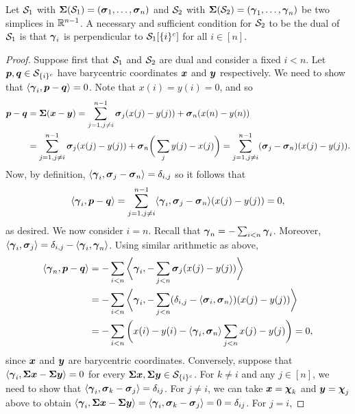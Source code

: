 \begin{lemma}
	Let $\mathcal{S}_1$ with $\boldsymbol{\Sigma}(\mathcal{S}_1)=(\vb*{\sigma}_1,\dots,\vb*{\sigma}_n)$ and $\mathcal{S}_2$ with $\boldsymbol{\Sigma}(\mathcal{S}_2)=(\vb*{\gamma}_1,\dots,\vb*{\gamma}_n)$ be two simplices in $\mathbb{R}^{n-1}$. A necessary and sufficient condition for $\mathcal{S}_2$ to be the dual of $\mathcal{S}_1$ is that $\vb*{\gamma}_i$ is perpendicular to $\mathcal{S}_1[{\{i\}^c}]$ for all $i\in[n]$. 
\end{lemma}
\begin{proof}
Suppose first that $\mathcal{S}_1$ and $\mathcal{S}_2$ are dual 
and consider a fixed $i<n$. Let $\vb*{p},\vb*{q}\in\mathcal{S}_{\{i\}^c}$ have barycentric coordinates $\vb*{x}$ and $\vb*{y}$ respectively. We need to show that $\langle \vb*{\gamma}_i,\vb*{p}-\vb*{q}\rangle =0$. Note that $x(i)=y(i)=0$, and so 
\begin{align*}
    \vb*{p}-\vb*{q} &= \boldsymbol{\Sigma}(\vb*{x}-\vb*{y}) = \sum_{j=1,j\neq i}^{n-1} \vb*{\sigma}_j(x(j)-y(j)) + \vb*{\sigma}_n(x(n)-y(n)) \\
    &= \sum_{j=1,j\neq i}^{n-1} \vb*{\sigma}_j(x(j)-y(j)) + \vb*{\sigma}_n\bigg(\sum_{j}y(j)-x(j)\bigg) = \sum_{j=1,j\neq i}^{n-1} (\vb*{\sigma}_j-\vb*{\sigma}_n)(x(j)-y(j)). 
\end{align*}
Now, by definition, $\langle \vb*{\gamma}_i,\vb*{\sigma}_j-\vb*{\sigma}_n\rangle = \delta_{i,j}$ so it follows that \[\langle \vb*{\gamma}_i,\vb*{p}-\vb*{q}\rangle = \sum_{j=1,j\neq i}^{n-1}\langle \vb*{\gamma}_i,\vb*{\sigma}_j-\vb*{\sigma}_n\rangle (x(j)-y(j))=0,\]
as desired. We now consider $i=n$. Recall that $\vb*{\gamma}_n=-\sum_{i<n}\vb*{\gamma}_i$. Moreover, $\langle \vb*{\gamma}_i,\vb*{\sigma}_j\rangle = \delta_{i,j}-\langle \vb*{\gamma}_i,\vb*{\gamma}_n\rangle$. Using similar arithmetic as above, 
\begin{align*}
    \langle \vb*{\gamma}_n ,\vb*{p}-\vb*{q}\rangle &= -\sum_{i<n}\bigg\langle \vb*{\gamma}_i,-\sum_{j<n} \vb*{\sigma}_j(x(j)-y(j))\bigg\rangle \\
    &= -\sum_{i<n}\bigg\langle \vb*{\gamma}_i,-\sum_{j<n} (\delta_{i,j}-\langle \vb*{\sigma}_i,\vb*{\sigma}_n\rangle)(x(j)-y(j))\bigg\rangle \\
    &= -\sum_{i<n}\bigg(x(i)-y(i)-\langle\vb*{\gamma}_i,\vb*{\sigma}_n\rangle  \sum_{j<n} x(j)-y(j)\bigg) =0,
\end{align*}
since $\vb*{x}$ and $\vb*{y}$ are barycentric coordinates. Conversely, suppose that $\langle \vb*{\gamma}_i, \boldsymbol{\Sigma}\vb*{x}-\boldsymbol{\Sigma}\vb*{y}\rangle=0$ for every $\boldsymbol{\Sigma}\vb*{x},\boldsymbol{\Sigma}\vb*{y}\in\mathcal{S}_{\{i\}^c}$. For $k\neq i$ and any $j\in[n]$, we need to show that $\langle \vb*{\gamma}_i,\vb*{\sigma}_k-\vb*{\sigma}_j\rangle = \delta_{ij}$. For $j\neq i$, we can take $\vb*{x}=\boldsymbol{\chi}_k$ and $\vb*{y}=\boldsymbol{\chi}_j$ above to obtain $\langle \vb*{\gamma}_i,\boldsymbol{\Sigma}\vb*{x}-\boldsymbol{\Sigma}\vb*{y}\rangle = \langle \vb*{\gamma}_i,\vb*{\sigma}_k-\vb*{\sigma}_j\rangle = 0=\delta_{ij}$. For $j=i$, 
\end{proof}



